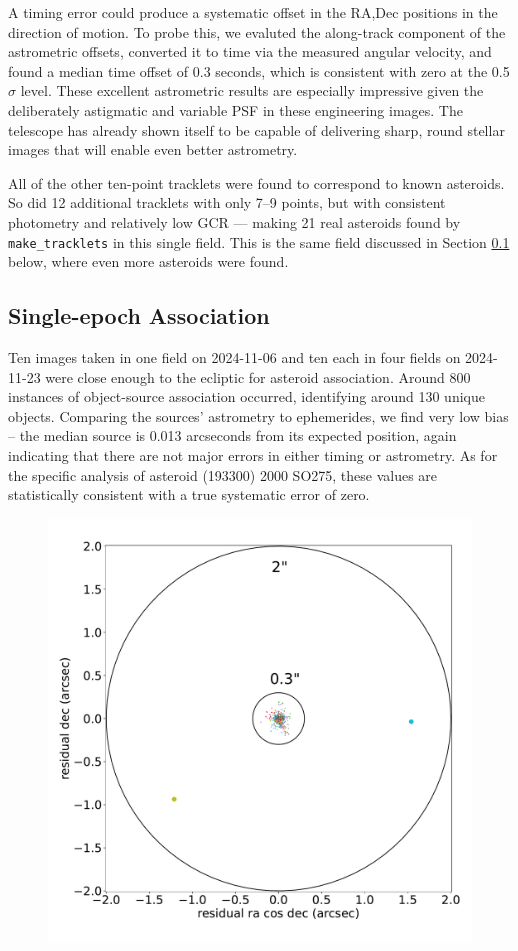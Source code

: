 A timing error could produce a systematic offset in the RA,Dec positions in
the direction of motion.  To probe this, we evaluted the along-track
component of the astrometric offsets, converted it to time via the measured
angular velocity, and found a median time offset of 0.3 seconds, which is
consistent with zero at the 0.5$\sigma$ level.  These excellent astrometric
results are especially impressive given the deliberately astigmatic and
variable PSF in these engineering images.  The telescope has already shown
itself to be capable of delivering sharp, round stellar images that will
enable even better astrometry.

All of the other ten-point tracklets were found to correspond to known
asteroids.  So did 12 additional tracklets with only 7--9 points, but with
consistent photometry and relatively low GCR --- making 21 real asteroids
found by {\tt make\_tracklets} in this single field.  This is the same field
discussed in Section \ref{sec:association} below, where even more asteroids
were found.

\subsection{Single-epoch Association}
\label{sec:association}

Ten images taken in one field on 2024-11-06 and ten each in four fields on
2024-11-23 were close enough to the ecliptic for asteroid association. 
Around 800 instances of object-source association occurred, identifying
around 130 unique objects.  Comparing the sources' astrometry to
ephemerides, we find very low bias -- the median source is 0.013 arcseconds
from its expected position, again indicating that there are not major errors
in either timing or astrometry.  As for the specific analysis of asteroid
(193300) 2000 SO275, these values are statistically consistent with a true
systematic error of zero.

\begin{figure}
  \label{fig:solar_system_residuals}
  \includegraphics{sso_figures/sso_residuals.pdf}
  \caption{}
\end{figure}
